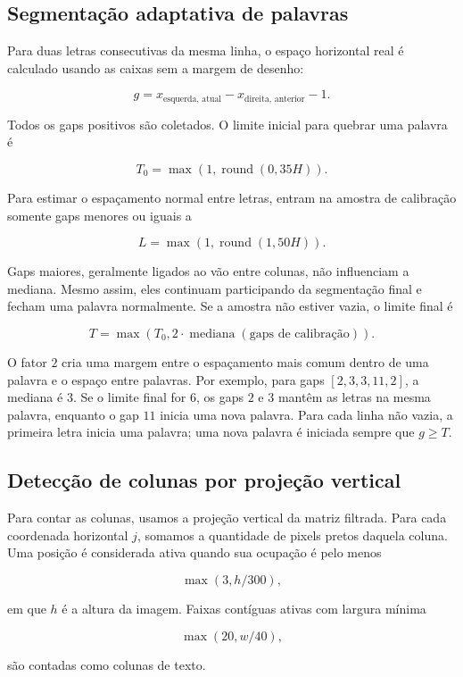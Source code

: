\documentclass[12pt,a4paper]{article}
\begin{document}
\subsection{Segmentação adaptativa de palavras}

Para duas letras consecutivas da mesma linha, o espaço horizontal real é calculado usando as caixas sem a margem de desenho:

\[
g = x_{\text{esquerda, atual}} - x_{\text{direita, anterior}} - 1.
\]

Todos os gaps positivos são coletados. O limite inicial para quebrar uma palavra é

\[
T_0 = \max(1,\operatorname{round}(0{,}35H)).
\]

Para estimar o espaçamento normal entre letras, entram na amostra de calibração somente gaps menores ou iguais a

\[
L = \max(1,\operatorname{round}(1{,}50H)).
\]

Gaps maiores, geralmente ligados ao vão entre colunas, não influenciam a mediana. Mesmo assim, eles continuam participando da segmentação final e fecham uma palavra normalmente. Se a amostra não estiver vazia, o limite final é

\[
T = \max(T_0, 2 \cdot \operatorname{mediana}(\text{gaps de calibração})).
\]

O fator $2$ cria uma margem entre o espaçamento mais comum dentro de uma palavra e o espaço entre palavras. Por exemplo, para gaps $[2,3,3,11,2]$, a mediana é $3$. Se o limite final for $6$, os gaps $2$ e $3$ mantêm as letras na mesma palavra, enquanto o gap $11$ inicia uma nova palavra. Para cada linha não vazia, a primeira letra inicia uma palavra; uma nova palavra é iniciada sempre que $g \geq T$.

\subsection{Detecção de colunas por projeção vertical}

Para contar as colunas, usamos a projeção vertical da matriz filtrada. Para cada coordenada horizontal $j$, somamos a quantidade de pixels pretos daquela coluna. Uma posição é considerada ativa quando sua ocupação é pelo menos

\[
\max(3, h/300),
\]

em que $h$ é a altura da imagem. Faixas contíguas ativas com largura mínima

\[
\max(20, w/40),
\]

são contadas como colunas de texto.
\end{document}
